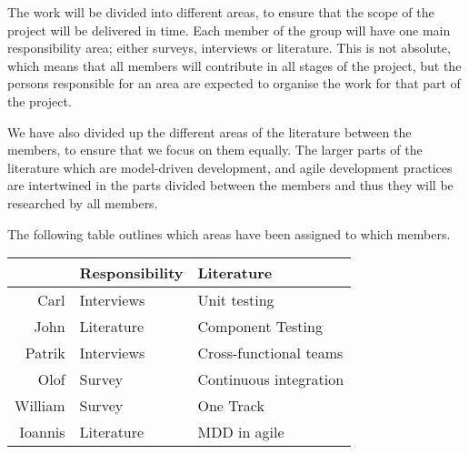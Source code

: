 \documentclass[ProjectPlan_innit.tex]{subfiles}
\begin{document}
The work will be divided into different areas, to ensure that the scope of the project will be delivered in time. Each member of the group will have one main responsibility area; either surveys, interviews or literature. This is not absolute, which means that all members will contribute in all stages of the project, but the persons responsible for an area are expected to organise the work for that part of the project. 
\smallskip


We have also divided up the different areas of the literature between the members, to ensure that we focus on them equally. The larger parts of the literature which are model-driven development, and agile development practices are intertwined in the parts divided between the members and thus they will be researched by all members.  
\smallskip

The following table outlines which areas have been assigned to which members. 

\begin{table}[h]
	\centering
	\begin{tabular} { r | l | l }

		& \textbf{Responsibility}	& \textbf{Literature} \\ \hline
		Carl 	& Interviews		& Unit testing \\ \hline
		John 	& Literature		& Component Testing \\ \hline
		Patrik 	& Interviews		& Cross-functional teams \\ \hline
		Olof	& Survey			& Continuous integration \\ \hline
		William	& Survey			& One Track \\ \hline
		Ioannis	& Literature		& MDD in agile \\

	\end{tabular}
\end{table}
\end{document}
